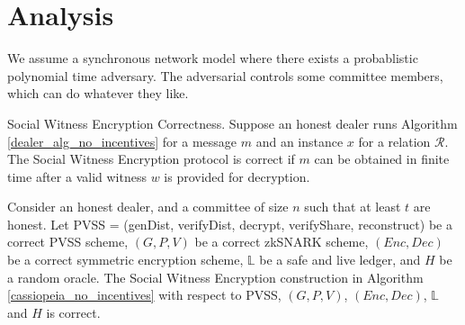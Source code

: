 \section{Analysis}
We assume a synchronous network model where there exists a probablistic polynomial time adversary.
The adversarial controls some committee members, which can do whatever they like.
\begin{definition}{Social Witness Encryption Correctness.}
    Suppose an honest dealer runs Algorithm \ref{dealer_alg_no_incentives} for a message $m$ and an instance $x$ for a relation $\mathcal{R}$.
    The Social Witness Encryption protocol is correct if $m$ can be obtained in finite time after a valid witness $w$ is provided for decryption.
\end{definition}
\begin{theorem}\label{correctness_hm}
    Consider an honest dealer, and a committee of size $n$ such that at least $t$ are honest.
    Let \textsf{PVSS} = (\textsf{genDist}, \textsf{verifyDist}, \textsf{decrypt}, \textsf{verifyShare}, \textsf{reconstruct}) be a correct PVSS scheme,
    $(G, P, V)$ be a correct zkSNARK scheme, $(Enc, Dec)$ be a correct symmetric encryption scheme,
    $\mathbb{L}$ be a safe and live ledger, and $H$ be a random oracle.
    The Social Witness Encryption construction in Algorithm \ref{cassiopeia_no_incentives} with respect to \textsf{PVSS}, $(G, P, V)$, $(Enc, Dec)$, $\mathbb{L}$ and $H$ is correct.
\end{theorem}
